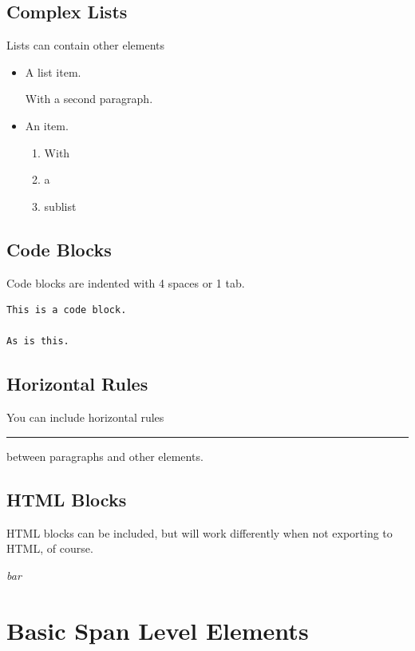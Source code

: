 \section{Complex Lists}
\label{complexlists}

Lists can contain other elements

\begin{itemize}
\item A list item.

With a second paragraph.
\item An item.

\begin{enumerate}
\item With
\item a
\item sublist
\end{enumerate}
\end{itemize}

\section{Code Blocks}
\label{codeblocks}

Code blocks are indented with 4 spaces or 1 tab.

\begin{verbatim}
This is a code block.

As is this.
\end{verbatim}

\section{Horizontal Rules}
\label{horizontalrules}

You can include horizontal rules

\begin{center}\rule{3in}{0.4pt}\end{center}

between paragraphs and other elements.

\section{HTML Blocks}
\label{htmlblocks}

HTML blocks can be included, but will work differently when not exporting to HTML, of course.

\emph{bar}

\chapter{Basic Span Level Elements}
\label{basicspanlevelelements}


